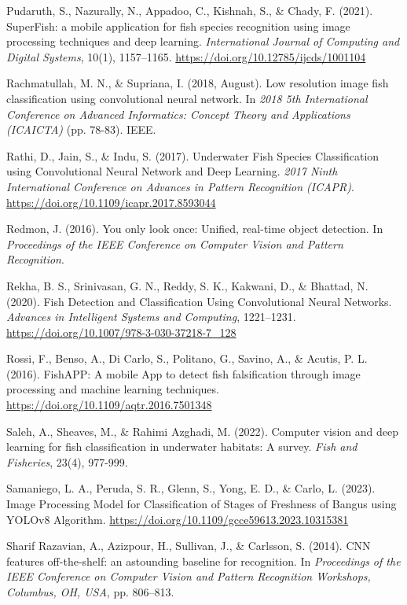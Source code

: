 \begin{bibliography}
 Pudaruth, S., Nazurally, N., Appadoo, C., Kishnah, S., \& Chady, F. (2021). SuperFish: a mobile application for fish species recognition using image processing techniques and deep learning. \textit{International Journal of Computing and Digital Systems}, 10(1), 1157–1165. \url{https://doi.org/10.12785/ijcds/1001104}

 Rachmatullah, M. N., \& Supriana, I. (2018, August). Low resolution image fish classification using convolutional neural network. In \textit{2018 5th International Conference on Advanced Informatics: Concept Theory and Applications (ICAICTA)} (pp. 78-83). IEEE.

 Rathi, D., Jain, S., \& Indu, S. (2017). Underwater Fish Species Classification using Convolutional Neural Network and Deep Learning. \textit{2017 Ninth International Conference on Advances in Pattern Recognition (ICAPR)}. \url{https://doi.org/10.1109/icapr.2017.8593044}

 Redmon, J. (2016). You only look once: Unified, real-time object detection. In \textit{Proceedings of the IEEE Conference on Computer Vision and Pattern Recognition}.

 Rekha, B. S., Srinivasan, G. N., Reddy, S. K., Kakwani, D., \& Bhattad, N. (2020). Fish Detection and Classification Using Convolutional Neural Networks. \textit{Advances in Intelligent Systems and Computing}, 1221–1231. \url{https://doi.org/10.1007/978-3-030-37218-7_128}

 Rossi, F., Benso, A., Di Carlo, S., Politano, G., Savino, A., \& Acutis, P. L. (2016). FishAPP: A mobile App to detect fish falsification through image processing and machine learning techniques. \url{https://doi.org/10.1109/aqtr.2016.7501348}

 Saleh, A., Sheaves, M., \& Rahimi Azghadi, M. (2022). Computer vision and deep learning for fish classification in underwater habitats: A survey. \textit{Fish and Fisheries}, 23(4), 977-999.

 Samaniego, L. A., Peruda, S. R., Glenn, S., Yong, E. D., \& Carlo, L. (2023). Image Processing Model for Classification of Stages of Freshness of Bangus using YOLOv8 Algorithm. \url{https://doi.org/10.1109/gcce59613.2023.10315381}

 Sharif Razavian, A., Azizpour, H., Sullivan, J., \& Carlsson, S. (2014). CNN features off-the-shelf: an astounding baseline for recognition. In \textit{Proceedings of the IEEE Conference on Computer Vision and Pattern Recognition Workshops, Columbus, OH, USA}, pp. 806–813.


\end{bibliography}

